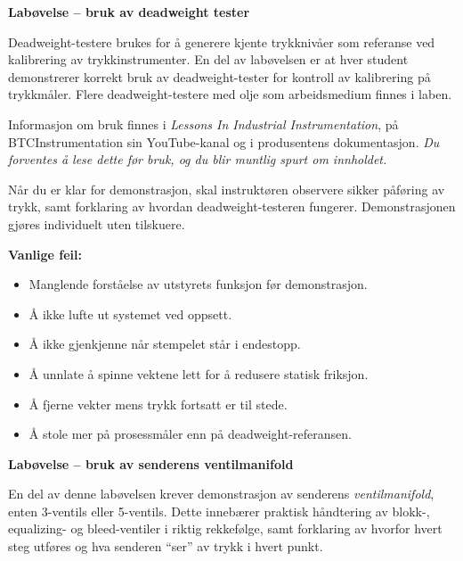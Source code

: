 \vfil \eject

\noindent
{\bf Labøvelse -- bruk av deadweight tester}

\vskip 5pt

Deadweight-testere brukes for å generere kjente trykknivåer som referanse ved kalibrering av trykkinstrumenter. En del av labøvelsen er at hver student demonstrerer korrekt bruk av deadweight-tester for kontroll av kalibrering på trykkmåler. Flere deadweight-testere med olje som arbeidsmedium finnes i laben.

Informasjon om bruk finnes i {\it Lessons In Industrial Instrumentation}, på BTCInstrumentation sin YouTube-kanal og i produsentens dokumentasjon. {\it Du forventes å lese dette før bruk, og du blir muntlig spurt om innholdet.}

Når du er klar for demonstrasjon, skal instruktøren observere sikker påføring av trykk, samt forklaring av hvordan deadweight-testeren fungerer. Demonstrasjonen gjøres individuelt uten tilskuere.

\vskip 10pt

{\bf Vanlige feil:}

\begin{itemize}
\item{} Manglende forståelse av utstyrets funksjon før demonstrasjon.
\item{} Å ikke lufte ut systemet ved oppsett.
\item{} Å ikke gjenkjenne når stempelet står i endestopp.
\item{} Å unnlate å spinne vektene lett for å redusere statisk friksjon.
\item{} Å fjerne vekter mens trykk fortsatt er til stede.
\item{} Å stole mer på prosessmåler enn på deadweight-referansen.
\end{itemize}







\vfil \eject

\noindent
{\bf Labøvelse -- bruk av senderens ventilmanifold}

\vskip 5pt

En del av denne labøvelsen krever demonstrasjon av senderens {\it ventilmanifold}, enten 3-ventils eller 5-ventils. Dette innebærer praktisk håndtering av blokk-, equalizing- og bleed-ventiler i riktig rekkefølge, samt forklaring av hvorfor hvert steg utføres og hva senderen ``ser'' av trykk i hvert punkt.

